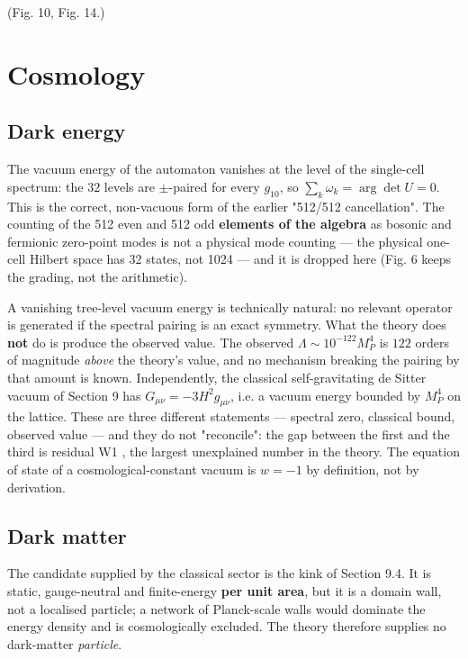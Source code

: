 \documentclass[aps,prd,amsmath,amssymb,superscriptaddress,longbibliography,floatfix,preprint]{revtex4-2}
\begin{document}
{\begin{longtable}{llll}
\end{longtable}
}

(Fig. 10, Fig. 14.)

\section{Cosmology}

\subsection{Dark energy}

The vacuum energy of the automaton vanishes at the level of the single-cell spectrum: the 32 levels are $\pm$-paired for every $g_{10}$, so $\sum_k\omega_k = \arg\det U = 0$. This is the correct, non-vacuous form of the earlier "512/512 cancellation". The counting of the 512 even and 512 odd \textbf{elements of the algebra} as bosonic and fermionic zero-point modes is not a physical mode counting --- the physical one-cell Hilbert space has 32 states, not 1024 --- and it is dropped here (Fig. 6 keeps the grading, not the arithmetic).

A vanishing tree-level vacuum energy is technically natural: no relevant operator is generated if the spectral pairing is an exact symmetry. What the theory does \textbf{not} do is produce the observed value. The observed $\Lambda \sim 10^{-122}M_P^4$ is $122$ orders of magnitude \emph{above} the theory's value, and no mechanism breaking the pairing by that amount is known. Independently, the classical self-gravitating de Sitter vacuum of Section 9 has $G_{\mu\nu} = -3H^2 g_{\mu\nu}$, i.e. a vacuum energy bounded by $M_P^4$ on the lattice. These are three different statements --- spectral zero, classical bound, observed value --- and they do not "reconcile": the gap between the first and the third is residual W1 \cite{ref37}, the largest unexplained number in the theory. The equation of state of a cosmological-constant vacuum is $w = -1$ by definition, not by derivation.

\subsection{Dark matter}

The candidate supplied by the classical sector is the kink of Section 9.4. It is static, gauge-neutral and finite-energy \textbf{per unit area}, but it is a domain wall, not a localised particle; a network of Planck-scale walls would dominate the energy density and is cosmologically excluded. The theory therefore supplies no dark-matter \emph{particle}.
\end{document}
